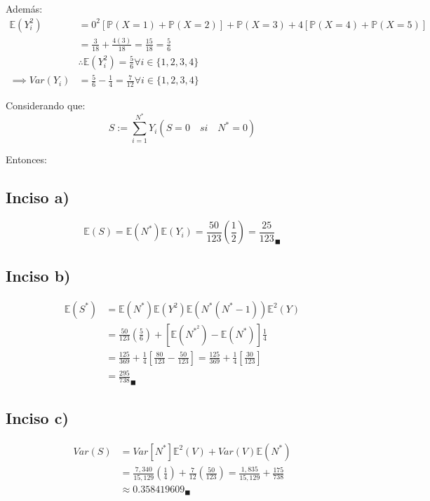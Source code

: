\documentclass[
]{article}
\begin{document}
Además: \begin{align*}
\mathbb{E}(Y_{i}^{2}) &= 0^{2}[\mathbb{P}(X = 1) + \mathbb{P}(X = 2)] + \mathbb{P}(X = 3) + 4[\mathbb{P}(X = 4) + \mathbb{P}(X = 5)]\\
&= \frac{3}{18} + \frac{4(3)}{18} = \frac{15}{18} = \frac{5}{6}\\
&\therefore \mathbb{E}(Y_{i}^{2}) = \frac{5}{6} \forall i \in \{1,2,3,4\}\\
\implies Var(Y_{i}) &= \frac{5}{6} - \frac{1}{4} = \frac{7}{12} \forall i \in \{1,2,3,4\}
\end{align*}

Considerando que:
\[S:= \sum_{i = 1}^{N^{*}}Y_{i}(S = 0 \quad si \quad N^{*} = 0)\]

Entonces:

\hypertarget{inciso-a-4}{%
\subsection{Inciso a)}\label{inciso-a-4}}

\[\mathbb{E}(S) = \mathbb{E}(N^{*})\mathbb{E}(Y_{i}) = \frac{50}{123}(\frac{1}{2}) = \frac{25}{123}_\blacksquare\]

\hypertarget{inciso-b-3}{%
\subsection{Inciso b)}\label{inciso-b-3}}

\begin{align*}
\mathbb{E}(S^{*}) &= \mathbb{E}(N^{*})\mathbb{E}(Y^{2}) 
\mathbb{E}(N^{*}(N^{*} - 1))\mathbb{E}^{2}(Y)\\
&= \frac{50}{123}\left(\frac{5}{6}\right) + \left[\mathbb{E}(N^{*^{2}}) - \mathbb{E}(N^{*})\right] \frac{1}{4}\\
&= \frac{125}{369} + \frac{1}{4} \left[\frac{80}{123} - \frac{50}{123}\right] = \frac{125}{369} + \frac{1}{4} \left[\frac{30}{123}\right]\\
&= \frac{295}{738}_\blacksquare
\end{align*}

\hypertarget{inciso-c-3}{%
\subsection{Inciso c)}\label{inciso-c-3}}

\begin{align*}
Var(S) &= Var[N^{*}]\mathbb{E}^{2}(V) + Var(V)\mathbb{E}(N^{*})\\
&= \frac{7,340}{15,129}\left(\frac{1}{4}\right) + \frac{7}{12} \left(\frac{50}{123}\right)  = \frac{1,835}{15,129} + \frac{175}{738}\\
&\approx 0.358419609_\blacksquare
\end{align*}
\end{document}
